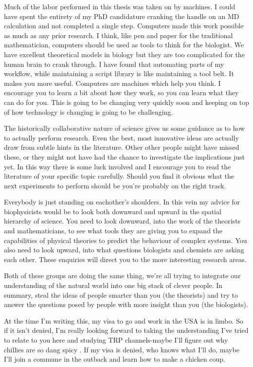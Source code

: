 Much of the labor performed in this thesis was taken on by machines. I could have spent the entirety of my PhD candidature cranking the handle on an MD calculation and not completed a single step. Computers made this work possible as much as any prior research. I think, like pen and paper for the traditional mathematician, computers should be used as tools to think for the biologist. We have excellent theoretical models in biology but they are too complicated for the human brain to crank through. I have found that automating parts of my workflow, while maintaining a script library is like maintaining a tool belt. It makes you more useful. Computers are machines which help you think. I encourage you to learn a bit about how they work, so you can learn what they can do for you. This is going to be changing very quickly soon and keeping on top of how technology is changing is going to be challenging. 

The historically collaborative nature of science gives us some guidance as to how to actually perform research. Even the best, most innovative ideas are actually draw from subtle hints in the literature. Other other people might have missed these, or they might not have had the chance to investigate the implications just yet. In this way there is some luck involved and I encourage you to read the literature of your specific topic carefully. Should you find it obvious what the next experiments to perform should be you're probably on the right track.

Everybody is just standing on eachother's shoulders. In this vein my advice for biophysicists would be to look both downward and upward in the spatial hierarchy of science. You need to look downward, into the work of the theorists and mathematicians, to see what tools they are giving you to expand the capabilities of physical theories to predict the behaviour of complex systems. You also need to look upward, into what questions biologists and chemists are asking each other. These enquiries will direct you to the more interesting research areas. 

Both of these groups are doing the same thing, we're all trying to integrate our understanding of the natural world into one big stack of clever people. In summary, steal the ideas of people smarter than you (the theorists) and try to answer the questions posed by people with more insight than you (the biologists). 

At the time I'm writing this, my visa to go and work in the USA is in limbo. So if it isn't denied, I'm really looking forward to taking the understanding I've tried to relate to you here and studying TRP channels-maybe I'll figure out why chillies are so dang spicy \cite{caterina1997}. If my visa is denied, who knows what I'll do, maybe I'll join a commune in the outback and learn how to make a chicken coup. 


